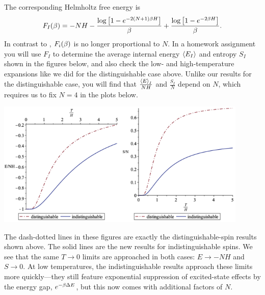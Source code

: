 The corresponding Helmholtz free energy is
\begin{equation}
  \label{eq:indist_Helm}
  F_I(\beta) = -NH - \frac{\log\left[1 - e^{-2(N + 1) \beta H}\right]}{\beta} + \frac{\log\left[1 - e^{-2 \beta H}\right]}{\beta}.
\end{equation}
In contrast to , $F_i(\beta)$ is no longer proportional to $N$.
In a homework assignment you will use $F_I$ to determine the average internal energy $\left\langle E_I \right\rangle$ and entropy $S_I$ shown in the figures below, and also check the low- and high-temperature expansions like we did for the distinguishable case above.
Unlike our results for the distinguishable case, you will find that $\frac{\left\langle E \right\rangle_I}{NH}$ and $\frac{S_I}{N}$ depend on $N$, which requires us to fix $N = 4$ in the plots below.
\begin{center} %
  \includegraphics[width=0.45\textwidth]{figs/week03_energies.pdf}\hfill \includegraphics[width=0.45\textwidth]{figs/week03_entropies.pdf}
\end{center}

The dash-dotted lines in these figures are exactly the distinguishable-spin results shown above.
The solid lines are the new results for indistinguishable spins.
We see that the same $T \to 0$ limits are approached in both cases: $E \to -NH$ and $S \to 0$.
At low temperatures, the indistinguishable results approach these limits more quickly---they still feature exponential suppression of excited-state effects by the energy gap, $e^{-\beta \Delta E}$, but this now comes with additional factors of $N$.


